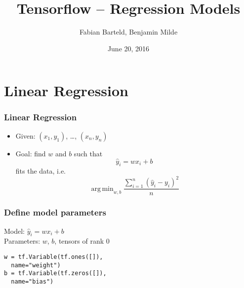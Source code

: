 \documentclass{beamer}
\title{Tensorflow -- Regression Models}
\author{Fabian Barteld, Benjamin Milde}
\date[20.06.2016]{June 20, 2016}
\DeclareMathOperator*{\argmin}{arg\,min}
\begin{document}
\maketitle

\section{Linear Regression}

\begin{frame}
\frametitle{Linear Regression}

\begin{itemize}
\item Given: $(x_1, y_1)$, \ldots, $(x_n,y_n)$
\item Goal: find $w$ and $b$ such that
  \begin{displaymath}
    \hat{y}_i = wx_i + b
  \end{displaymath}
  fits the data, i.e.
  \begin{displaymath}
    \argmin_{w, b} \frac{\sum^n_{i=1} (\hat{y}_i - y_i)^2}{n}
  \end{displaymath}
\end{itemize}

\end{frame}

\begin{frame}[fragile]
\frametitle{Define model parameters}
Model: $\hat{y}_i = wx_i + b$\\
Parameters: $w$, $b$, tensors of rank $0$

\begin{lstlisting}
w = tf.Variable(tf.ones([]),
  name="weight")
b = tf.Variable(tf.zeros([]),
  name="bias")
\end{lstlisting}
\end{frame}
\end{document}
